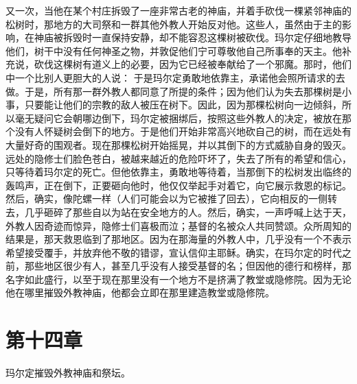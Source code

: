 又一次，当他在某个村庄拆毁了一座非常古老的神庙，并着手砍伐一棵紧邻神庙的松树时，那地方的大司祭和一群其他外教人开始反对他。这些人，虽然由于主的影响，在神庙被拆毁时一直保持安静，却不能容忍这棵树被砍伐。玛尔定仔细地教导他们，树干中没有任何神圣之物，并敦促他们宁可尊敬他自己所事奉的天主。他补充说，砍伐这棵树有道义上的必要，因为它已经被奉献给了一个邪魔。\newline{}那时，他们中一个比别人更胆大的人说： 于是玛尔定勇敢地依靠主，承诺他会照所请求的去做。于是，所有那一群外教人都同意了所提的条件；因为他们认为失去那棵树是小事，只要能让他们的宗教的敌人被压在树下。因此，因为那棵松树向一边倾斜，所以毫无疑问它会朝哪边倒下，玛尔定被捆绑后，按照这些外教人的决定，被放在那个没有人怀疑树会倒下的地方。于是他们开始非常高兴地砍自己的树，而在远处有大量好奇的围观者。现在那棵松树开始摇晃，并以其倒下的方式威胁自身的毁灭。远处的隐修士们脸色苍白，被越来越近的危险吓坏了，失去了所有的希望和信心，只等待着玛尔定的死亡。但他依靠主，勇敢地等待着，当那倒下的松树发出临终的轰鸣声，正在倒下，正要砸向他时，他仅仅举起手对着它，向它展示救恩的标记。然后，确实，像陀螺一样（人们可能会以为它被推了回去），它向相反的一侧转去，几乎砸碎了那些自以为站在安全地方的人。然后，确实，一声呼喊上达于天，外教人因奇迹而惊异，隐修士们喜极而泣；基督的名被众人共同赞颂。众所周知的结果是，那天救恩临到了那地区。因为在那海量的外教人中，几乎没有一个不表示希望接受覆手，并放弃他不敬的错谬，宣认信仰主耶稣。确实，在玛尔定的时代之前，那些地区很少有人，甚至几乎没有人接受基督的名；但因他的德行和榜样，那名字如此盛行，以至于现在那里没有一个地方不是挤满了教堂或隐修院。因为无论他在哪里摧毁外教神庙，他都会立即在那里建造教堂或隐修院。\par


\section{第十四章}

玛尔定摧毁外教神庙和祭坛。\par


